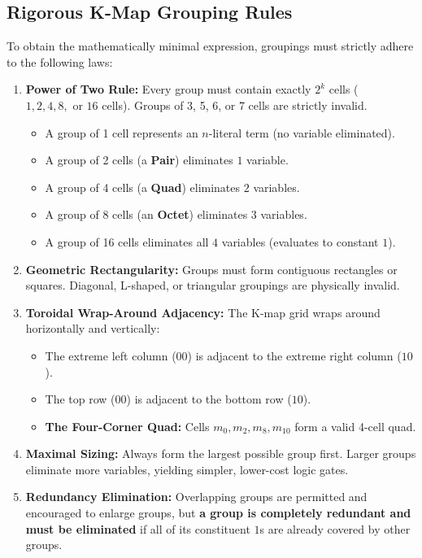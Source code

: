 \subsection{Rigorous K-Map Grouping Rules}
To obtain the mathematically minimal expression, groupings must strictly adhere to the following laws:
\begin{enumerate}[label=\bfseries\arabic*.]
    \item \textbf{Power of Two Rule:} Every group must contain exactly $2^k$ cells ($1, 2, 4, 8, \text{ or } 16$ cells). Groups of 3, 5, 6, or 7 cells are strictly invalid.
    \begin{itemize}
        \item A group of 1 cell represents an $n$-literal term (no variable eliminated).
        \item A group of 2 cells (a \textbf{Pair}) eliminates $1$ variable.
        \item A group of 4 cells (a \textbf{Quad}) eliminates $2$ variables.
        \item A group of 8 cells (an \textbf{Octet}) eliminates $3$ variables.
        \item A group of 16 cells eliminates all $4$ variables (evaluates to constant $1$).
    \end{itemize}
    \item \textbf{Geometric Rectangularity:} Groups must form contiguous rectangles or squares. Diagonal, L-shaped, or triangular groupings are physically invalid.
    \item \textbf{Toroidal Wrap-Around Adjacency:} The K-map grid wraps around horizontally and vertically:
    \begin{itemize}
        \item The extreme left column ($00$) is adjacent to the extreme right column ($10$).
        \item The top row ($00$) is adjacent to the bottom row ($10$).
        \item \textbf{The Four-Corner Quad:} Cells $m_0, m_2, m_8, m_{10}$ form a valid 4-cell quad.
    \end{itemize}
    \item \textbf{Maximal Sizing:} Always form the largest possible group first. Larger groups eliminate more variables, yielding simpler, lower-cost logic gates.
    \item \textbf{Redundancy Elimination:} Overlapping groups are permitted and encouraged to enlarge groups, but \textbf{a group is completely redundant and must be eliminated} if all of its constituent $1$s are already covered by other groups.
\end{enumerate}

